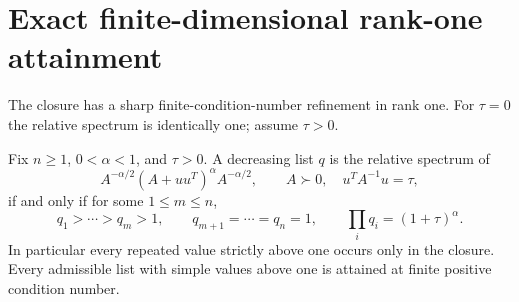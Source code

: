 \section{Exact finite-dimensional rank-one attainment}\label{ex:sec:finite-attainment}
The closure has a sharp finite-condition-number refinement in rank one.
For $\tau=0$ the relative spectrum is identically one; assume $\tau>0$.

\begin{theorem}\label{ex:thm:exact}
Fix $n\ge1$, $0<\alpha<1$, and $\tau>0$.
A decreasing list $q$ is the relative spectrum of
\[
 A^{-\alpha/2}(A+uu^T)^\alpha A^{-\alpha/2},
 \qquad A\succ0,\quad u^TA^{-1}u=\tau,
\]
if and only if for some $1\le m\le n$,
\[
 q_1>\cdots>q_m>1,\qquad
 q_{m+1}=\cdots=q_n=1,\qquad
 \prod_iq_i=(1+\tau)^\alpha.
\]
In particular every repeated value strictly above one occurs only in
the closure. Every admissible list with simple values above one is
attained at finite positive condition number.
\end{theorem}

